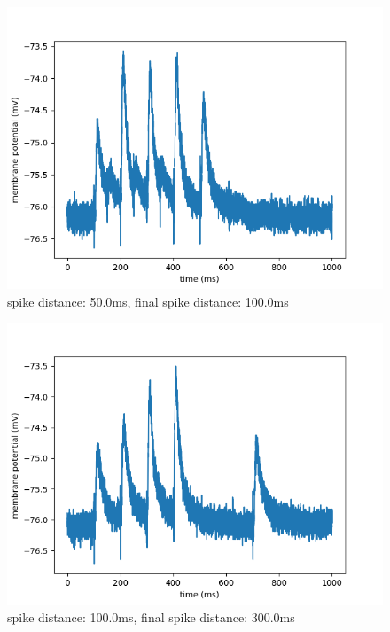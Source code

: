 \documentclass[10pt,a4paper]{scrartcl}
\begin{document}
\begin{figure} [ht]
\begin{center}
\label{fig:abb12}
\caption{spike distance: 50.0ms, final spike distance: 100.0ms}
\includegraphics[scale=0.35]{pictures/final_spike_variation_1.pdf} 
\end{center}
\end{figure}

\newpage

\begin{figure} [ht]
\begin{center}
\label{fig:abb13}
\caption{spike distance: 100.0ms, final spike distance: 300.0ms}
\includegraphics[scale=0.35]{pictures/final_spike_variation_2.pdf} 
\end{center}
\end{figure}
\end{document}
